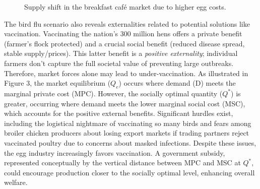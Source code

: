 \documentclass[12pt]{article}
\begin{document}
\begin{doublespace}
\begin{figure}[H]
    \caption{Supply shift in the breakfast caf\'{e} market due to higher egg costs.}
    \label{fig:cafe_market}
  \end{figure}

  The bird flu scenario also reveals externalities related to potential solutions like vaccination. Vaccinating the nation's 300 million hens offers a private benefit (farmer's flock protected) and a crucial social benefit (reduced disease spread, stable supply/prices). This latter benefit is a \emph{positive externality}; individual farmers don't capture the full societal value of preventing large outbreaks. Therefore, market forces alone may lead to under-vaccination. As illustrated in Figure 3, the market equilibrium ($Q_e$) occurs where demand (D) meets the marginal private cost (MPC). However, the socially optimal quantity ($Q^*$) is greater, occurring where demand meets the lower marginal social cost (MSC), which accounts for the positive external benefits. Significant hurdles exist, including the logistical nightmare of vaccinating so many birds and fears among broiler chicken producers about losing export markets if trading partners reject vaccinated poultry due to concerns about masked infections. Despite these issues, the egg industry increasingly favors vaccination. A government subsidy, represented conceptually by the vertical distance between MPC and MSC at $Q^*$, could encourage production closer to the socially optimal level, enhancing overall welfare.


\end{doublespace}
\end{document}
